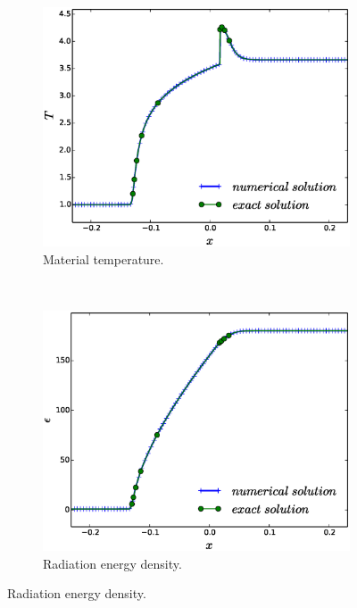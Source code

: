 \documentclass[times,doublespace]{fldauth}%
\begin{document}
\begin{figure}[h]
    \begin{subfigure}{0.32\textwidth}
    \centering
    \includegraphics[width=\linewidth]{figures/dpt-xs/mass-diff-mat-temp-nel-2700-plot.eps}
    \caption{Material temperature.}\label{fig:mach-3-dpt-xs-mat-temp}
    \end{subfigure}
    ~
    \begin{subfigure}{0.32\textwidth}
    \centering
    \includegraphics[width=\linewidth]{figures/dpt-xs/mass-diff-radiation-nel-2700-plot.eps}
    \caption{Radiation energy density.}\label{fig:mach-3-dpt-xs-rad-temp}
    \end{subfigure}

\end{figure}
\end{document}
